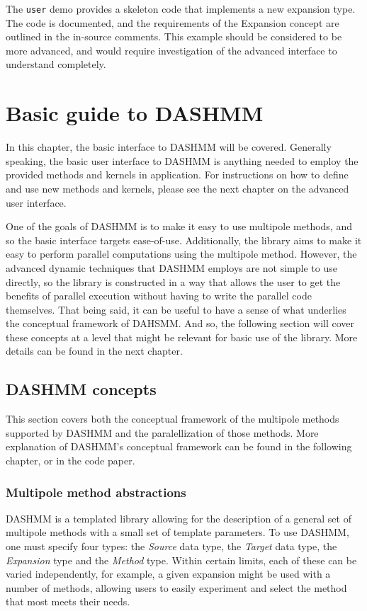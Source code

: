 \documentclass[11pt]{book}
\begin{document}
The {\tt user} demo provides a skeleton code that implements a new
expansion type. The code is documented, and the requirements of the
Expansion concept are outlined in the in-source comments. This example
should be considered to be more advanced, and would require
investigation of the advanced interface to understand completely. 

\chapter{Basic guide to DASHMM} 
In this chapter, the basic interface to DASHMM will be
covered. Generally speaking, the basic user interface to DASHMM is
anything needed to employ the provided methods and kernels in
application. For instructions on how to define and use new methods and
kernels, please see the next chapter on the advanced user interface. 

One of the goals of DASHMM is to make it easy to use multipole
methods, and so the basic interface targets ease-of-use. Additionally,
the library aims to make it easy to perform parallel computations
using the multipole method. However, the advanced dynamic techniques
that DASHMM employs are not simple to use directly, so the library is
constructed in a way that allows the user to get the benefits of
parallel execution without having to write the parallel code
themselves. That being said, it can be useful to have a sense of what
underlies the conceptual framework of DAHSMM. And so, the following
section will cover these concepts at a level that might be relevant
for basic use of the library. More details can be found in the next
chapter. 

\section{DASHMM concepts} 
This section covers both the conceptual framework of the multipole
methods supported by DASHMM and the paralellization of those
methods. More explanation of DASHMM's conceptual framework can be
found in the following chapter, or in the code paper. 

\subsection{Multipole method abstractions} 

DASHMM is a templated library allowing for the description of a
general set of multipole methods with a small set of template
parameters. To use DASHMM, one must specify four types: the {\it Source}
data type, the {\it Target} data type, the {\it Expansion} type and
the {\it Method} type. Within certain limits, each of these can be
varied independently, for example, a given expansion might be used
with a number of methods, allowing users to easily experiment and
select the method that most meets their needs. 
\end{document}
